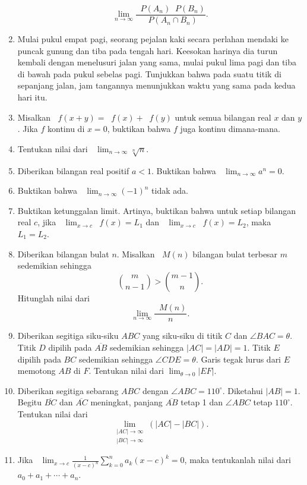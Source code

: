 \documentclass[12pt]{article}
\newcommand*\func[2]{\mathop{}\!{#1}{\left({#2}\right)}}
\newcommand*\ds[1]{\mathop{}\!\displaystyle{{#1}}}
\begin{document}
\begin{enumerate}[leftmargin=*]
		\[ \lim_{n \to \infty}{\frac{\func{P}{A_{n}}\func{P}{B_{n}}}{\func{P}{A_{n} \cap B_{n}}}}. \]
		\item Mulai pukul empat pagi, seorang pejalan kaki secara perlahan mendaki ke puncak gunung dan tiba pada tengah hari. Keesokan harinya dia turun kembali dengan menelusuri jalan yang sama, mulai pukul lima pagi dan tiba di bawah pada pukul sebelas pagi. Tunjukkan bahwa pada suatu titik di sepanjang jalan, jam tangannya menunjukkan waktu yang sama pada kedua hari itu.
		\item Misalkan $ \func{f}{x + y} = \func{f}{x} + \func{f}{y} $ untuk semua bilangan real $ x $ dan $ y $. Jika $ f $ kontinu di $ x = 0 $, buktikan bahwa $ f $ juga kontinu dimana-mana.
		\item Tentukan nilai dari $ \ds{\lim_{n \to \infty}{\sqrt[n]{n}}} $.
		\item Diberikan bilangan real positif $ a < 1 $. Buktikan bahwa $ \ds{\lim_{n \to \infty}{a^{n}}} = 0 $.
		\item Buktikan bahwa $ \ds{\lim_{n \to \infty}{\left(-1\right)^{n}}} $ tidak ada.
		\item Buktikan ketunggalan limit. Artinya, buktikan bahwa untuk setiap bilangan real $ c $, jika $ \ds{\lim_{x \to c}{\func{f}{x}}} = L_{1} $ dan $ \ds{\lim_{x \to c}{\func{f}{x}}} = L_{2} $, maka $ L_{1} = L_{2} $.
		\item Diberikan bilangan bulat $ n $. Misalkan $ \func{M}{n} $ bilangan bulat terbesar $ m $ sedemikian sehingga
		\[ \binom{m}{n - 1} > \binom{m - 1}{n}. \]
		Hitunglah nilai dari
		\[ \lim_{n \to \infty}{\frac{\func{M}{n}}{n}}. \]
		\item Diberikan segitiga siku-siku $ ABC $ yang siku-siku di titik $ C $ dan $ \angle{BAC} = \theta $. Titik $ D $ dipilih pada $ \overline{AB} $ sedemikian sehingga $ \left|AC\right| = \left|AD\right| = 1 $. Titik $ E $ dipilih pada $ BC $ sedemikian sehingga $ \angle{CDE} = \theta $. Garis tegak lurus dari $ E $ memotong $ AB $ di $ F $. Tentukan nilai dari $ \displaystyle{\lim_{\theta \to 0}{\left|EF\right|}} $.
		\item Diberikan segitiga sebarang $ ABC $ dengan $ \angle{ABC} = 110^{\circ} $. Diketahui $ \left|AB\right| = 1 $. Begitu $ \overline{BC} $ dan $ \overline{AC} $ meningkat, panjang $ \overline{AB} $ tetap 1 dan $ \angle{ABC} $ tetap $ 110^{\circ} $. Tentukan nilai dari
		\[ \lim_{\substack{\left|AC\right| \to \infty \\ \left|BC\right| \to \infty}}{\left(\left|AC\right| - \left|BC\right|\right)}. \]
		\item Jika $ \ds{\lim_{x \to c}{\frac{1}{\left(x - c\right)^{n}}\sum_{k = 0}^{n}{a_{k}\left(x - c\right)^{k}}}} = 0 $, maka tentukanlah nilai dari $ a_{0} + a_{1} + \cdots + a_{n} $.

\end{enumerate}
\end{document}
